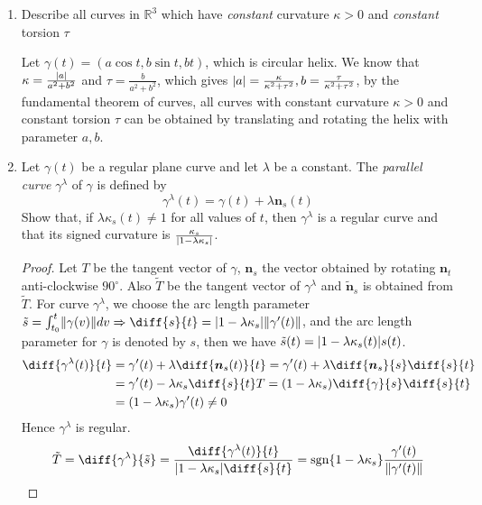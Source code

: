 \documentclass{article}
\DeclarePairedDelimiter\abs{\lvert}{\rvert}
\DeclarePairedDelimiter\norm{\lVert}{\rVert}
\DeclareMathOperator\sgn{sgn}
\begin{document}
\begin{enumerate}
\begin{proof}
Counterexample: Let $\gamma(t):(t,t^3)\Rightarrow k(t)=\frac{6\abs{t}}{(1+9t^4)^{3/2}}$. Since \textit{abs} function is not smooth at $t=0$, $k(t)$ is not smooth.
\end{proof}
\item Describe all curves in $\mathbb{R}^3$ which have \textit{constant} curvature $\kappa>0$ and \textit{constant} torsion $\tau$
\begin{solution}
Let $\gamma(t) = (a\cos t, b\sin t, bt)$, which is circular helix. We know that $\kappa = \frac{\abs{a}}{a^2+b^2}$ and $\tau = \frac{b}{a^2+b^2}$, which gives $ \abs{a}=\frac{\kappa}{\kappa^2+\tau^2},b=\frac{\tau}{\kappa^2+\tau^2}$, by the fundamental theorem of curves, all curves with constant curvature $\kappa>0$ and constant torsion $\tau$ can be obtained by translating and rotating the helix with parameter $a,b$.
\end{solution}
\newpage
\item Let $\gamma(t)$ be a regular plane curve and let $\lambda$ be a constant. The \textit{parallel curve} $\gamma^{\lambda}$ of $\gamma$ is defined by
\begin{equation}
\gamma^{\lambda}(t) = \gamma(t) + \lambda \bm{n}_s (t)
\end{equation}
Show that, if $\lambda \kappa_s(t) \neq 1 $ for all values of $t$, then $\gamma^{\lambda}$ is a regular curve and that its signed curvature is 
$\frac{\kappa_s}{\abs{1-\lambda \kappa_s}}$.
\begin{proof}
Let $T$ be the tangent vector of $\gamma$, $\bm{n}_s$ the vector obtained by rotating $\bm{n}_t$ anti-clockwise $90^\circ$.
Also $\tilde{T}$ be the tangent vector of $\gamma^{\lambda}$ and $\tilde{\bm{n}}_s$ is obtained from $\tilde{T}$. For curve $\gamma^{\lambda}$, we choose the arc length parameter $\tilde{s} =\int_{t_0}^t \norm{\gamma(v)}dv \Rightarrow \diff{s}{t}=\abs{1-\lambda\kappa_s}\norm{\gamma'(t)}$, and the arc length parameter for $\gamma$ is denoted by $s$, then we have $\tilde{s}(t)=\abs{1-\lambda\kappa_s(t)}s(t)$.
\begin{align*}
\diff{\gamma^{\lambda}(t)}{t} & = \gamma'(t) +\lambda \diff{\bm{n}_s (t)}{t}  =   \gamma'(t) + \lambda \diff{\bm{n}_s}{s}\diff{s}{t}\\
& =\gamma'(t) - \lambda \kappa_s \diff{s}{t} T = (1-\lambda \kappa_s)\diff{\gamma}{s} \diff{s}{t}\\
& = (1-\lambda\kappa_s)\gamma'(t) \neq 0
\end{align*}
Hence $\gamma^{\lambda}$ is regular.
$$
\tilde{T}=\diff{\gamma^{\lambda}}{\tilde{s}}=\frac{\diff{\gamma^{\lambda}(t)}{t}}{\abs{1-\lambda \kappa_s}\diff{s}{t}}=\sgn\{1-\lambda\kappa_s\}\frac{\gamma'(t)}{\norm{\gamma'(t)}}
$$
\end{proof}
\end{enumerate}
\end{document}
